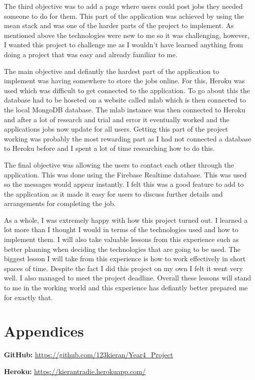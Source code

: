 The third objective was to add a page where users could post jobs they needed someone to do for them. This part of the application was achieved by using the mean stack and was one of the harder parts of the project to implement. As mentioned above the technologies were new to me so it was challenging, however, I wanted this project to challenge me as I wouldn't have learned anything from doing a project that was easy and already familiar to me.

The main objective and defiantly the hardest part of the application to implement was having somewhere to store the jobs online. For this, Heroku was used which was difficult to get connected to the application. To go about this the database had to be hoseted on a website called mlab which is then connected to the local MongoDB database. The mlab instance was then connected to Heroku and after a lot of research and trial and error it eventually worked and the applications jobs now update for all users. Getting this part of the project working was probably the most rewarding part as I had not connected a database to Heroku before and I spent a lot of time researching how to do this.

The final objective was allowing the users to contact each other through the application. This was done using the Firebase Realtime database. This was used so the messages would appear instantly. I felt this was a good feature to add to the application as it made it easy for users to discuss further details and arrangements for completing the job.


As a whole, I was extremely happy with how this project turned out. I learned a lot more than I thought I would in terms of the technologies used and how to implement them. I will also take valuable lessons from this experience such as better planning when deciding the technologies that are going to be used. The biggest lesson I will take from this experience is how to work effectively in short spaces of time. Despite the fact I did this project on my own I felt it went very well. I also managed to meet the project deadline. Overall these lessons will stand to me in the working world and this experience has defiantly better prepared me for exactly that.




\chapter{Appendices}
\textbf {GitHub: } \url{https://github.com/123kieran/Year4_Project}

\textbf {Heroku: } \url{https://kierantradie.herokuapp.com/}
